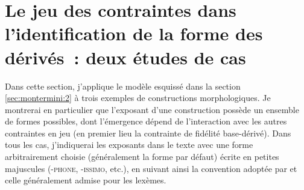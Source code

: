 \documentclass[output=paper]{langsci/langscibook}
\begin{document}
\section{Le jeu des contraintes dans l'identification de la forme des
dérivés~: deux études de cas}\label{sec:montermini:3}
\largerpage
Dans cette section, j'applique le modèle esquissé dans la section \ref{sec:montermini:2} à
trois exemples de constructions morphologiques. Je
montrerai en particulier que l'exposant d'une construction possède un ensemble de
formes possibles, dont l'émergence dépend de l'interaction avec les
autres contraintes en jeu (en premier lieu la contrainte de fidélité
base-dérivé). Dans tous les cas, j'indiquerai les exposants dans le
texte avec une forme arbitrairement choisie (généralement la forme par
défaut) écrite en petites majuscules (-\textsc{phone, -issimo}, etc.),
en suivant ainsi la convention adoptée par %
\citet{LignonStephanie2011} %
%
et
celle généralement admise pour les lexèmes.
\end{document}
